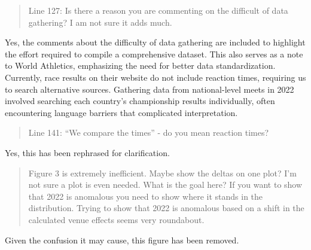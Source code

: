 \documentclass[12pt]{article}
\newcommand{\eds}[1]{\textcolor{blue}{(EDS: #1)}}
\newenvironment{comment}%
{\begin{quotation}\noindent\small\it\color{darkblue}\ignorespaces%
}{\end{quotation}}
\begin{document}
\begin{comment}
Line 127: Is there a reason you are commenting on the difficult of data
gathering? I am not sure it adds much.
\end{comment}


Yes, the comments about the difficulty of data gathering are included
to highlight the effort required to compile a comprehensive
dataset. This also serves as a note to World Athletics, emphasizing
the need for better data standardization. Currently, race results on
their website do not include reaction times, requiring us to search
alternative sources. Gathering data from national-level meets in 2022
involved searching each country’s championship results individually,
often encountering language barriers that complicated interpretation.


\begin{comment}
Line 141: “We compare the times” - do you mean reaction times?
\end{comment}

Yes, this has been rephrased for clarification.

\begin{comment}
Figure 3 is extremely inefficient. Maybe show the deltas on one plot? I'm not
sure a plot is even needed. What is the goal here? If you want to show that 2022
is anomalous you need to show where it stands in the distribution. Trying to
show that 2022 is anomalous based on a shift in the calculated venue effects
seems very roundabout.
\end{comment}


Given the confusion it may cause, this figure has been removed.





\end{document}
